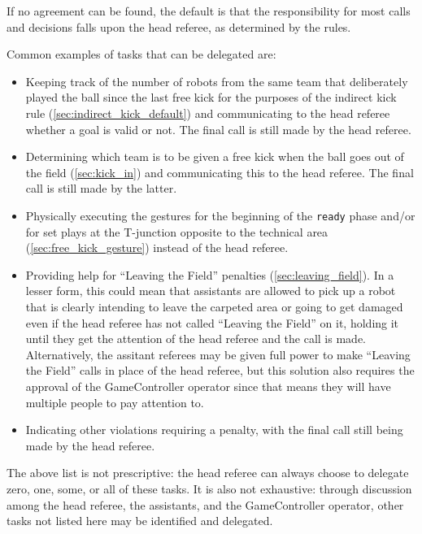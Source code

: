If no agreement can be found, the default is that the responsibility for most
calls and decisions falls upon the head referee, as determined by the rules.

Common examples of tasks that can be delegated are:

\begin{itemize}
  \item Keeping track of the number of robots from the same team that deliberately played the ball
        since the last free kick for the purposes of the indirect kick rule (\cref{sec:indirect_kick_default})
        and communicating to the head referee whether a goal is valid or not.
        The final call is still made by the head referee.
  \item Determining which team is to be given a free kick when the ball goes
        out of the field (\cref{sec:kick_in}) and communicating this to the head referee.
        The final call is still made by the latter.
  \item Physically executing the gestures for the beginning of the \texttt{ready}
        phase and/or for set plays at the T-junction opposite to the technical area
        (\cref{sec:free_kick_gesture}) instead of the head referee.
  \item Providing help for ``Leaving the Field'' penalties (\cref{sec:leaving_field}). In a lesser form,
        this could mean that assistants are allowed to pick up a robot that is
        clearly intending to leave the carpeted area or going to get damaged
        even if the head referee has not called ``Leaving the Field'' on it,
        holding it until they get the attention of the head referee
        and the call is made.
        Alternatively, the assitant referees may be given full power to make
        ``Leaving the Field'' calls in place of the head referee, but this solution
        also requires the approval of the GameController operator since that means
        they will have multiple people to pay attention to.
  \item Indicating other violations requiring a penalty, with the final call still
        being made by the head referee.
\end{itemize}

The above list is not prescriptive: the head referee can always choose to delegate
zero, one, some, or all of these tasks. It is also not exhaustive: through
discussion among the head referee, the assistants, and the GameController operator,
other tasks not listed here may be identified and delegated.

